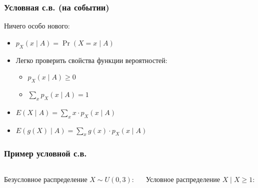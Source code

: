 \documentclass[hyperref=unicode,graphics=pdflatex,13pt,xcolor={usenames,dvipsnames}]{beamer}
\newcommand\pitem{\pause\item}
\begin{document}
\begin{frame}
  \frametitle{Условная с.в. (на событии)}

  Ничего особо нового:

  \begin{itemize}
    \item $p_X(x \mid A) = \Pr(X = x \mid A)$
    \pitem Легко проверить свойства функции вероятностей:
    \begin{itemize}
      \item $p_X(x \mid A) \ge 0$
      \item $\sum_x p_X(x \mid A) = 1$
    \end{itemize}
    \pitem $E(X \mid A) = \sum_x x \cdot p_X(x \mid A)$
    \pitem $E(g(X) \mid A) = \sum_x g(x) \cdot p_X(x \mid A)$
  \end{itemize}
\end{frame}


\begin{frame}
  \frametitle{Пример условной с.в.}
  \begin{columns}
    \begin{column}{0.5\textwidth}
      Безусловное распределение $X \sim U(0, 3)$:
    \end{column}
    \begin{column}{0.5\textwidth}
      Условное распределение $X \mid X \ge 1$:
    \end{column}
  \end{columns}
\end{frame}
\end{document}
